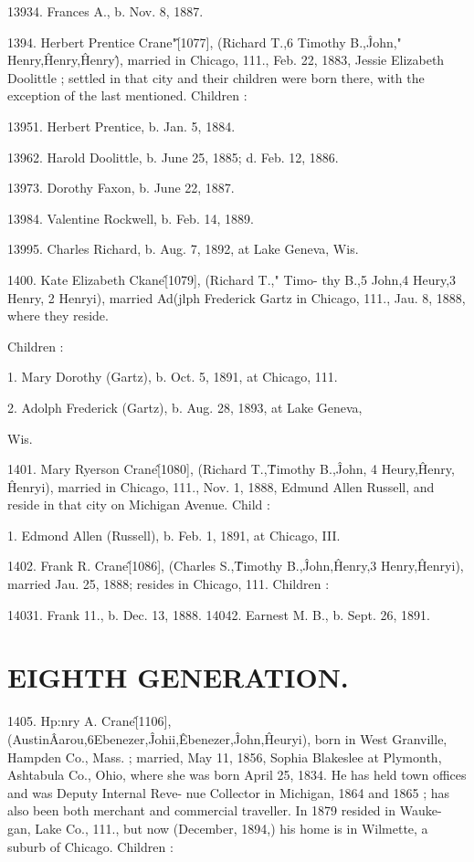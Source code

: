 13934. Frances A., b. Nov. 8, 1887. 

1394. Herbert Prentice Crane"\^ [1077], (Richard T.,6 
Timothy B.,\^ John," Henry,\^ Henry,\^ Henry\^), married in 
Chicago, 111., Feb. 22, 1883, Jessie Elizabeth Doolittle ; settled 
in that city and their children were born there, with the exception 
of the last mentioned. Children : 

13951. Herbert Prentice, b. Jan. 5, 1884. 

13962. Harold Doolittle, b. June 25, 1885; d. Feb. 12, 1886. 

13973. Dorothy Faxon, b. June 22, 1887. 

13984. Valentine Rockwell, b. Feb. 14, 1889. 

13995. Charles Richard, b. Aug. 7, 1892, at Lake Geneva, Wis. 




1400. Kate Elizabeth Ckane\^ [1079], (Richard T.," Timo- 
thy B.,5 John,4 Heury,3 Henry, 2 Henryi), married Ad(jlph 
Frederick Gartz in Chicago, 111., Jau. 8, 1888, where they reside. 

Children : 

1. Mary Dorothy (Gartz), b. Oct. 5, 1891, at Chicago, 111. 

2. Adolph Frederick (Gartz), b. Aug. 28, 1893, at Lake Geneva, 

Wis. 

1401. Mary Ryerson Crane\^ [1080], (Richard T.,\^ Timothy 
B.,\^ John, 4 Heury,\^ Henry, \^ Henryi), married in Chicago, 111., 
Nov. 1, 1888, Edmund Allen Russell, and reside in that city on 
Michigan Avenue. Child : 

1. Edmond Allen (Russell), b. Feb. 1, 1891, at Chicago, III. 

1402. Frank R. Crane\^ [1086], (Charles S.,\^ Timothy B.,\^ 
John,\^ Henry,3 Henry,\^ Henryi), married Jau. 25, 1888; resides 
in Chicago, 111. Children : 

14031. Frank 11., b. Dec. 13, 1888. 
14042. Earnest M. B., b. Sept. 26, 1891. 



\section{EIGHTH GENERATION.}


1405. Hp:nry A. Crane\^ [1106], (Austin\^ Aarou,6Ebenezer,\^ 
Johii,\^ Ebenezer,\^ John,\^ Heuryi), born in West Granville, 
Hampden Co., Mass. ; married, May 11, 1856, Sophia Blakeslee 
at Plymonth, Ashtabula Co., Ohio, where she was born April 25, 
1834. He has held town offices and was Deputy Internal Reve- 
nue Collector in Michigan, 1864 and 1865 ; has also been both 
merchant and commercial traveller. In 1879 resided in Wauke- 
gan, Lake Co., 111., but now (December, 1894,) his home is in 
Wilmette, a suburb of Chicago. Children : 

